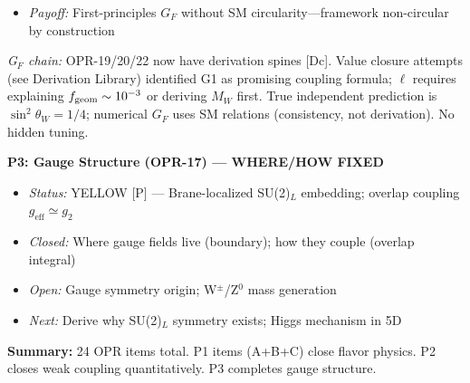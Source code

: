 \begin{tcolorbox}[breakable, enhanced, colback=blue!5, colframe=blue!60!black,
    title=\textbf{OPR Closure Plan: Prioritized Research Program}, width=\linewidth]
\begin{itemize}[nosep]
    \item \emph{Payoff:} First-principles $G_F$ without SM circularity---framework non-circular by construction
\end{itemize}
\noindent\emph{G$_F$ chain:} OPR-19/20/22 now have derivation spines [Dc]. Value closure attempts (see Derivation Library) identified G1 as promising coupling formula; $\ell$ requires explaining $f_{\rm geom} \sim 10^{-3}$ or deriving $M_W$ first. True independent prediction is $\sin^2\theta_W = 1/4$; numerical $G_F$ uses SM relations (consistency, not derivation). No hidden tuning.

\textbf{P3: Gauge Structure (OPR-17) --- WHERE/HOW FIXED}
\begin{itemize}[nosep]
    \item \emph{Status:} YELLOW [P] --- Brane-localized SU(2)$_L$ embedding; overlap coupling $g_{\text{eff}} \simeq g_2$
    \item \emph{Closed:} Where gauge fields live (boundary); how they couple (overlap integral)
    \item \emph{Open:} Gauge symmetry origin; W$^\pm$/Z$^0$ mass generation
    \item \emph{Next:} Derive why SU(2)$_L$ symmetry exists; Higgs mechanism in 5D
\end{itemize}

\textbf{Summary:} 24 OPR items total. P1 items (A+B+C) close flavor physics.
P2 closes weak coupling quantitatively. P3 completes gauge structure.
\end{tcolorbox}



